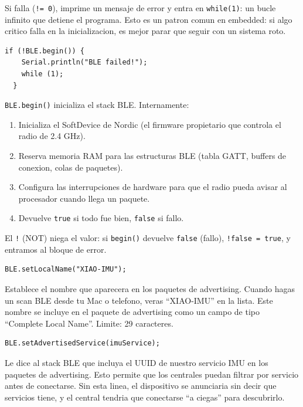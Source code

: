 \documentclass[11pt,a4paper]{article}
\begin{document}
Si falla (\texttt{!= 0}), imprime un mensaje de error y entra en
\texttt{while(1)}: un bucle infinito que detiene el programa. Esto
es un patron comun en embedded: si algo critico falla en la
inicializacion, es mejor parar que seguir con un sistema roto.

\begin{lstlisting}[style=arduino]
  if (!BLE.begin()) {
    Serial.println("BLE failed!");
    while (1);
  }
\end{lstlisting}

\texttt{BLE.begin()} inicializa el stack BLE. Internamente:

\begin{enumerate}
    \item Inicializa el SoftDevice de Nordic (el firmware
          propietario que controla el radio de 2.4 GHz).
    \item Reserva memoria RAM para las estructuras BLE (tabla GATT,
          buffers de conexion, colas de paquetes).
    \item Configura las interrupciones de hardware para que el
          radio pueda avisar al procesador cuando llega un paquete.
    \item Devuelve \texttt{true} si todo fue bien, \texttt{false}
          si fallo.
\end{enumerate}

El \texttt{!} (NOT) niega el valor: si \texttt{begin()} devuelve
\texttt{false} (fallo), \texttt{!false = true}, y entramos al
bloque de error.

\begin{lstlisting}[style=arduino]
  BLE.setLocalName("XIAO-IMU");
\end{lstlisting}

Establece el nombre que aparecera en los paquetes de advertising.
Cuando hagas un scan BLE desde tu Mac o telefono, veras ``XIAO-IMU''
en la lista. Este nombre se incluye en el paquete de advertising
como un campo de tipo ``Complete Local Name''. Limite: 29 caracteres.

\begin{lstlisting}[style=arduino]
  BLE.setAdvertisedService(imuService);
\end{lstlisting}

Le dice al stack BLE que incluya el UUID de nuestro servicio IMU en
los paquetes de advertising. Esto permite que los centrales puedan
filtrar por servicio antes de conectarse. Sin esta linea, el
dispositivo se anunciaria sin decir que servicios tiene, y el central
tendria que conectarse ``a ciegas'' para descubrirlo.
\end{document}
